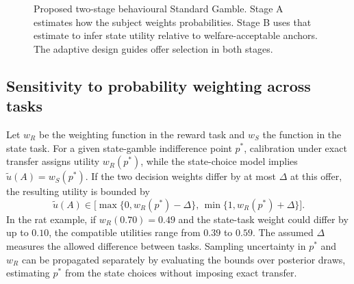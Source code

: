 \documentclass[11pt,a4paper]{article}
\begin{document}
\begin{figure}[t]
\centering
{}
\caption{Proposed two-stage behavioural Standard Gamble. Stage A estimates how the subject weights probabilities. Stage B uses that estimate to infer state utility relative to welfare-acceptable anchors. The adaptive design guides offer selection in both stages.}
\label{fig:overview}
\end{figure}

\subsection{Sensitivity to probability weighting across tasks}
\label{sec:transfer-sensitivity}

Let $w_R$ be the weighting function in the reward task and $w_S$ the function in the state task. For a given state-gamble indifference point $p^\ast$, calibration under exact transfer assigns utility $w_R(p^\ast)$, while the state-choice model implies $\tilde u(A)=w_S(p^\ast)$. If the two decision weights differ by at most $\Delta$ at this offer, the resulting utility is bounded by
\begin{equation}
  \tilde u(A)\in
  \bigl[\max\{0,w_R(p^\ast)-\Delta\},\,
        \min\{1,w_R(p^\ast)+\Delta\}\bigr].
  \label{eq:transfer-bound}
\end{equation}
In the rat example, if $w_R(0.70)=0.49$ and the state-task weight could differ by up to $0.10$, the compatible utilities range from $0.39$ to $0.59$. The assumed $\Delta$ measures the allowed difference between tasks. Sampling uncertainty in $p^\ast$ and $w_R$ can be propagated separately by evaluating the bounds over posterior draws, estimating $p^\ast$ from the state choices without imposing exact transfer.
\end{document}

